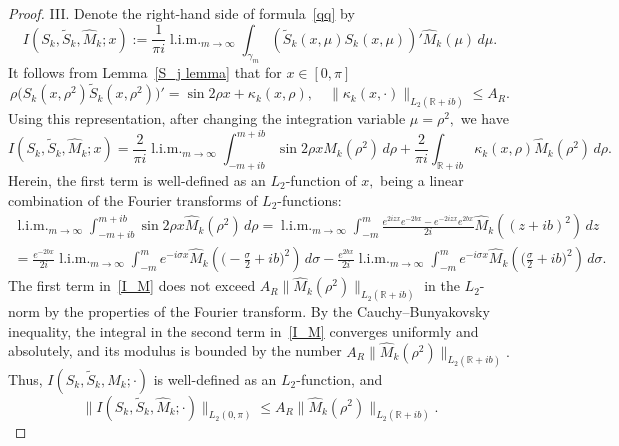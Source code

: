 \documentclass[a4paper, 12pt] {article}
\theoremstyle{plain}
\theoremstyle{remark}
\theoremstyle{plain}
\theoremstyle{definition}
\numberwithin{equation}{section}
\begin{document}
\begin{proof}
III. Denote the right-hand side of formula~\eqref{qq} by
$$I(S_k, \tilde S_k, \hat M_k; x) := \frac{1}{\pi i} \mathop{l.i.m.}_{m \to \infty} \mathop{\int}_{\gamma_m} (\tilde S_k(x, \mu) S_k(x, \mu))' \hat M_k(\mu) \, d\mu.$$
It follows from Lemma~\ref{S_j lemma} that for $x \in [0, \pi]$
\begin{equation*} \label{SS'}
\rho\big(S_k(x, \rho^2) \tilde S_k(x, \rho^2)\big)' = \sin 2 \rho x + \kappa_{k}(x, \rho), \quad \| \kappa_k(x, \cdot)\|_{L_2({\mathbb R}+ib)} \le A_R.
\end{equation*}
Using this representation, after changing the integration variable $\mu = \rho^2,$ we have
\begin{equation}
I(S_k, \tilde S_k, \hat M_k; x) =    \frac{2}{\pi i} \mathop{l.i.m.}_{m \to \infty}  \int_{-m+ib}^{m+ib} \sin 2 \rho x \hat M_k(\rho^2) \,d\rho + \frac{2}{\pi i}\mathop{\int}_{\mathbb{R}+ib} \kappa_k(x, \rho)\hat M_k(\rho^2) \,d\rho.
\label{I_M}
\end{equation}
Herein, the first term is well-defined as an $L_2$-function of $x,$ being a linear combination of the Fourier transforms of $L_2$-functions:
\begin{equation*}\begin{split}
\mathop{l.i.m.}_{m \to \infty}  \int_{-m+ib}^{m+ib} \sin 2 \rho x \hat M_k(\rho^2) \,d\rho = \mathop{l.i.m.}_{m \to \infty} \int_{-m}^m \frac{e^{2i z x} e^{-2bx} - e^{-2izx}e^{2bx}}{2i} \hat M_k((z + ib)^2)\,dz\\
= \frac{e^{-2bx}}{2i}\mathop{l.i.m.}_{m \to \infty} \int_{-m}^m e^{-i \sigma x} \hat M_k\left(\Big(-\frac\sigma2 + ib\Big)^2\right)\,d\sigma- \frac{e^{2bx}}{2i}\mathop{l.i.m.}_{m \to \infty} \int_{-m}^m e^{-i\sigma x}\hat M_k\left(\Big(\frac\sigma2 + ib\Big)^2\right)\,d\sigma.
\end{split}
\end{equation*}
The first term in~\eqref{I_M} does not exceed $A_R \| \hat M_k(\rho^2) \|_{L_2(\mathbb R + ib)}$ in the $L_2$-norm by the properties of the Fourier transform.
By the Cauchy--Bunyakovsky inequality, the integral in the second term in~\eqref{I_M} converges uniformly and absolutely, and its modulus is bounded by the number $A_R \| \hat M_k(\rho^2) \|_{L_2(\mathbb R + ib)}.$
Thus, $I(S_k, \tilde S_k, \hat M_k; \cdot)$ is well-defined as an $L_2$-function, and
\begin{equation} \label{I M_k}
\| I(S_k, \tilde S_k, \hat M_k; \cdot) \|_{L_2(0, \pi)} \le A_R \| \hat M_k(\rho^2) \|_{L_2(\mathbb R + ib)}.
\end{equation}


\end{proof}
\end{document}
